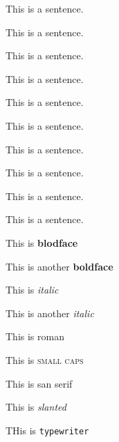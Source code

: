 \documentclass[a4paper, 12pt]{article}
\begin{document}
  {\tiny This is a sentence.}
  
  {\scriptsize This is a sentence.}
  
  {\footnotesize This is a sentence.}
  
  {\small This is a sentence.}
  
  {\normalsmall This is a sentence.}
  
  {\large This is a sentence.}
  
  {\Large This is a sentence.}
  
 {\LARGE This is a sentence.}
  
  {\huge This is a sentence.}
  
  {\Huge This is a sentence.}
  
  This is \textbf{blodface}
  
  This is another {\bf boldface}
  
  This is \textit{italic}
  
  This is another {\it italic}
  
  This is \textrm{roman}
  
  This is \textsc{small caps}
  
  This is \textsf{san serif}
  
  This is \textsl{slanted}
  
  THis is \texttt{typewriter}
  
  
\end{document}
